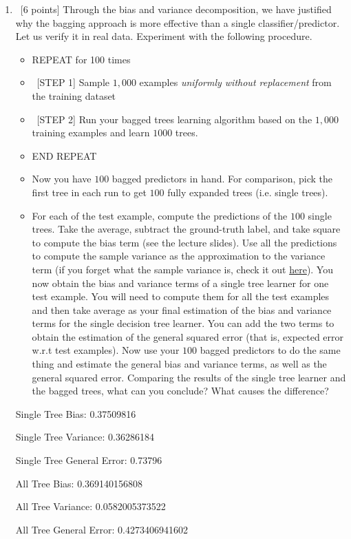 \documentclass[12pt, fullpage,letterpaper]{article}
\begin{document}
\begin{enumerate}
\begin{enumerate}
	\item~[6 points] Through the bias and variance decomposition, we have justified why the bagging approach is more effective than a single classifier/predictor. Let us verify it in real data. Experiment with the following procedure.
	\begin{itemize}
		\item REPEAT for 100 times
		\item ~[STEP 1] Sample $1,000$ examples \textit{uniformly without replacement} from the training dataset
		\item ~[STEP 2] Run your bagged trees learning algorithm based on the $1,000$ training examples and learn $1000$ trees.
		\item END REPEAT 
		\item Now you have $100$ bagged predictors in hand. For comparison, pick the first tree in each run to get $100$ fully expanded trees (i.e. single trees). 
		\item 	For each of the test example, compute the predictions of the $100$ single trees. Take the average, subtract the ground-truth label, and take square to compute the bias term (see the lecture slides). Use all the predictions to compute the sample variance  as the approximation to the variance term (if you forget what the sample variance is, check it out 
		\href{http://www.randomservices.org/random/sample/Variance.html}{here}). You now obtain the bias and variance terms of a single tree learner for one test example. You will need to compute them for all the test examples and then take average as your final estimation of the bias and variance terms for the single decision tree learner. You can add the two terms to obtain the estimation of the general squared error (that is, expected error w.r.t test examples). Now use your $100$ bagged predictors to do the same thing and estimate the general bias and variance terms, as well as the general squared error.  Comparing the results of the single tree learner and the bagged trees, what can you conclude?  What causes the difference?  
	\end{itemize}
	\bigskip
	Single Tree Bias: 0.37509816
	
	Single Tree Variance: 0.36286184
	
	Single Tree General Error: 0.73796
	
	\bigskip
	
	All Tree Bias: 0.369140156808
	
	All Tree Variance: 0.0582005373522
	
	All Tree General Error: 0.4273406941602
	

\end{enumerate}
\end{enumerate}
\end{document}
